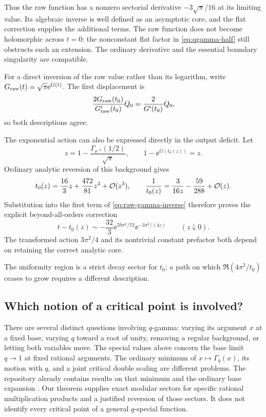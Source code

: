 Thus the raw function has a nonzero sectorial derivative
\(-3\sqrt{\pi}/16\) at its limiting value.
Its algebraic inverse is well defined as an asymptotic core, and
the flat correction supplies the additional terms.
The raw function does not become holomorphic across \(t=0\):
the nonconstant flat factor in \cref{eq:qgamma-half}
still obstructs such an extension.
The ordinary derivative and the essential boundary singularity
are compatible.

For a direct inversion of the raw value rather than its logarithm,
write
\(G_{\rm raw}(t)=\sqrt{\pi}\mathrm e^{G(t)}\).
The first displacement is
\[
 \frac{2G_{\rm raw}(t_0)}{G_{\rm raw}'(t_0)}Q_0
   =\frac{2}{G'(t_0)}Q_0,
\]
so both descriptions agree.

The exponential action can also be expressed directly in the output
deficit.  Let
\[
 z=1-\frac{\Gamma_{\ee^{-t}}(1/2)}{\sqrt\pi},\qquad
 1-\ee^{G(t_0(z))}=z.
\]
Ordinary analytic reversion of this background gives
\[
 t_0(z)=\frac{16}{3}z+\frac{472}{81}z^2+\mathcal O(z^3),\qquad
 \frac1{t_0(z)}=\frac{3}{16z}-\frac{59}{288}+\mathcal O(z).
\]
Substitution into the first term of \cref{eq:raw-gamma-inverse}
therefore proves the explicit beyond-all-orders correction
\begin{equation}\label{eq:gamma-deficit-action}
 t-t_0(z)\sim
 -\frac{32}{3}\ee^{59\pi^2/72}
 \ee^{-3\pi^2/(4z)}\qquad (z\downarrow0).
\end{equation}
The transformed action \(3\pi^2/4\) and its nontrivial constant
prefactor both depend on retaining the correct analytic core.

The uniformity region is a strict decay sector for \(t_0\);
a path on which \(\Re(4\pi^2/t_0)\) ceases to grow requires
a different description.

\subsection{Which notion of a critical point is involved?}

There are several distinct questions involving \(q\)-gamma:
varying its argument \(x\) at a fixed base, varying \(q\) toward a
root of unity, removing a regular background, or letting both
variables move.
The special values above concern the base limit \(q\to1\)
at fixed rational arguments.
The ordinary minimum of \(x\mapsto\Gamma_q(x)\), its motion
with \(q\), and a joint critical double scaling are different
problems.  The repository already contains results on that
minimum and the ordinary base expansion \cite{repo-qmono}.
Our theorem supplies exact modular sectors for specific rational
multiplication products and a justified reversion of those sectors.
It does not identify every critical point of a general
\(q\)-special function.
